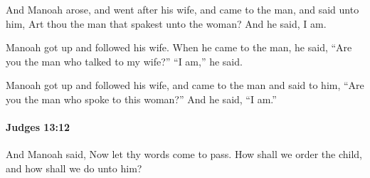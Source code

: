 			\begin{versebox}
					\item[BHS] 
					\item[ASV] And Manoah arose, and went after his wife, and came to the man, and said unto him, Art thou the man that spakest unto the woman? And he said, I am.
					\item[NIV] Manoah got up and followed his wife. When he came to the man, he said, “Are you the man who talked to my wife?” “I am,” he said.
					\item[NRSV] Manoah got up and followed his wife, and came to the man and said to him, “Are you the man who spoke to this woman?” And he said, “I am.”
			\end{versebox}

		\paragraph{Judges 13:12} %
			\label{JUDGES-13-12}

			And Manoah said, Now let thy words come to pass. How shall we order the child, and how shall we do unto him?


